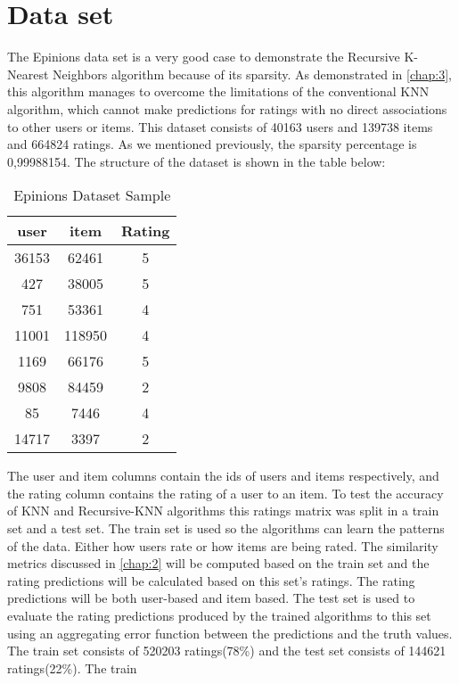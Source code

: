 
\section{Data set}
The Epinions data set \citep{Massa} is a very good case to demonstrate the Recursive
K-Nearest Neighbors algorithm because of its sparsity. As demonstrated in \autoref{chap:3},
this algorithm manages to overcome the limitations of the conventional KNN algorithm, which
cannot make predictions for ratings with no direct associations to other users or items.
This dataset consists of 40163 users and 139738 items and 664824 ratings.
As we mentioned previously, the sparsity percentage is 0,99988154.
The structure of the dataset is shown in the table below:
\begin{table}[H]
\centering
\caption{Epinions Dataset Sample}
\label{table:Epinions_sample}
\begin{tabular}{ |c|c|c| }
\hline
\textbf{user} & \textbf{item} & \textbf{Rating} \\
\hline
36153 & 62461 & 5 \\
\hline
427 & 38005 & 5  \\
\hline
751 & 53361 & 4 \\
\hline
11001 & 118950 & 4 \\
\hline
1169 & 66176 & 5 \\
\hline
9808 & 84459 & 2 \\
\hline
85 & 7446 & 4 \\
\hline
14717 & 3397 & 2 \\
\hline
\end{tabular}
\end{table}
The user and item columns contain the ids of users and items respectively, and the rating
column contains the rating of a user to an item. To test the accuracy of
KNN and Recursive-KNN algorithms this ratings matrix was split in a
train set and a test set. The train set is used so the algorithms can learn the
patterns of the data. Either how users rate or how items are being rated.
The similarity metrics discussed in \autoref{chap:2} will be computed based on
the train set and the rating predictions will be calculated based on this set's
ratings. The rating predictions will be both user-based and item based.
The test set is used to evaluate the rating predictions produced by the trained algorithms
to this set using an aggregating error function between the predictions
and the truth values. The train set consists of 520203
ratings(78\%) and the test set consists of 144621 ratings(22\%). The train
